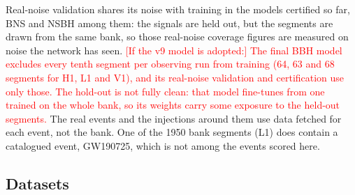 \documentclass[twocolumn,linenumbers]{aastex701}
\newcommand{\pending}[1]{\textcolor{red}{#1}}
\begin{document}
Real-noise validation shares its noise with training in the models certified so far, BNS
and NSBH among them: the signals are held out, but the segments are drawn from the same bank,
so those real-noise coverage figures are measured on noise the network has seen.
\pending{[If the v9 model is adopted:] The final BBH model excludes every tenth segment per
observing run from training (64, 63 and 68 segments for H1, L1 and V1), and its real-noise
validation and certification use only those. The hold-out is not fully clean: that model
fine-tunes from one trained on the whole bank, so its weights carry some exposure to the
held-out segments.} The real events and the injections around them use data fetched for
each event, not the bank. One of the 1950 bank segments (L1) does contain a catalogued event,
GW190725, which is not among the events scored here.

\subsection{Datasets} \label{sec:datasets}
\end{document}
